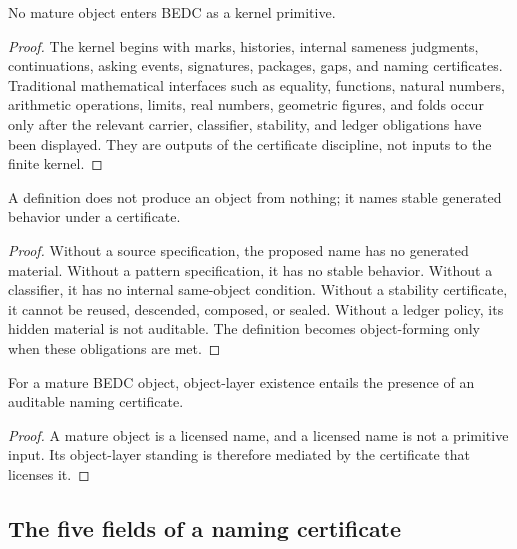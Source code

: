 \begin{theorem}
\label{thm:philosophy-anti-primitive-principle}
No mature object enters BEDC as a kernel primitive.
\end{theorem}
\begin{proof}
The kernel begins with marks, histories, internal sameness judgments,
continuations, asking events, signatures, packages, gaps, and naming
certificates. Traditional mathematical interfaces such as equality,
functions, natural numbers, arithmetic operations, limits, real
numbers, geometric figures, and folds occur only after the relevant
carrier, classifier, stability, and ledger obligations have been
displayed. They are outputs of the certificate discipline, not inputs
to the finite kernel.
\end{proof}

\begin{corollary}
\label{cor:philosophy-definitions-do-not-create-objects}
A definition does not produce an object from nothing; it names stable
generated behavior under a certificate.
\end{corollary}
\begin{proof}
Without a source specification, the proposed name has no generated
material. Without a pattern specification, it has no stable behavior.
Without a classifier, it has no internal same-object condition. Without
a stability certificate, it cannot be reused, descended, composed, or
sealed. Without a ledger policy, its hidden material is not auditable.
The definition becomes object-forming only when these obligations are
met.
\end{proof}

\begin{corollary}
\label{cor:philosophy-object-existence-certificate-existence}
For a mature BEDC object, object-layer existence entails the presence
of an auditable naming certificate.
\end{corollary}
\begin{proof}
A mature object is a licensed name, and a licensed name is not a
primitive input. Its object-layer standing is therefore mediated by the
certificate that licenses it.
\end{proof}

\subsection{The five fields of a naming certificate}
\label{subsec:philosophy-namecert-five-fields}

